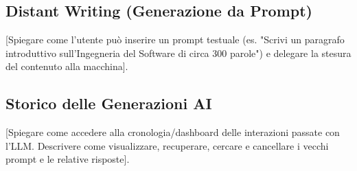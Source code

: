 \subsection{Distant Writing (Generazione da Prompt)}
[Spiegare come l'utente può inserire un prompt testuale (es. "Scrivi un paragrafo introduttivo sull'Ingegneria del Software di circa 300 parole") e delegare la stesura del contenuto alla macchina].

\subsection{Storico delle Generazioni AI}
[Spiegare come accedere alla cronologia/dashboard delle interazioni passate con l'LLM. Descrivere come visualizzare, recuperare, cercare e cancellare i vecchi prompt e le relative risposte].